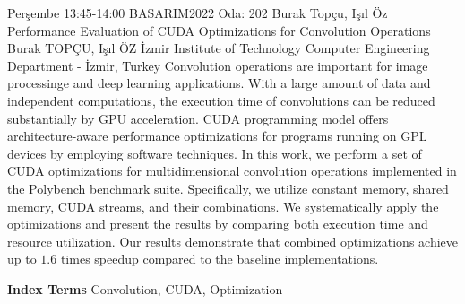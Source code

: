 
    \begin{abstract_basarim}
    {Perşembe 13:45-14:00}
    {BASARIM2022}
    {Oda: 202}
    {Burak Topçu, Işıl Öz}
    {Performance Evaluation of CUDA Optimizations for Convolution Operations}
    {%
    Burak TOPÇU, Işıl ÖZ}
    {%
    }
    {%
    İzmir Institute of Technology Computer Engineering Department - İzmir, Turkey}
    Convolution operations are important for image processinge and deep learning applications. With a large amount of data and independent computations, the execution time of convolutions can be reduced substantially by GPU acceleration. CUDA programming model offers architecture-aware performance optimizations for programs running on GPL devices by employing software techniques. In this work, we perform a set of CUDA optimizations for multidimensional convolution operations implemented in the Polybench benchmark suite. Specifically, we utilize constant memory, shared memory, CUDA streams, and their combinations. We systematically apply the optimizations and present the results by comparing both execution time and resource utilization. Our results demonstrate that combined optimizations achieve up to $1.6$ times speedup compared to the baseline implementations. 
    
            \textbf{Index Terms} \newline{}Convolution, CUDA, Optimization
    \end{abstract_basarim}
    
